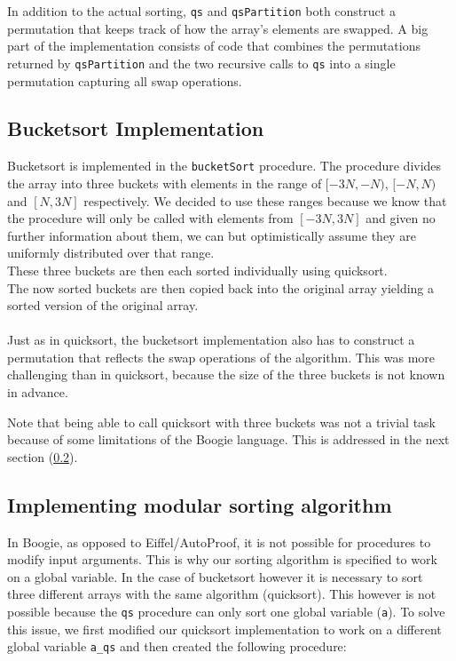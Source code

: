In addition to the actual sorting, \texttt{qs} and \texttt{qsPartition} both construct a permutation that
keeps track of how the array's elements are swapped. A big part of the implementation consists of code that
combines the permutations returned by \texttt{qsPartition} and the two recursive calls to \texttt{qs} into a single permutation
capturing all swap operations.

\subsection{Bucketsort Implementation}

Bucketsort is implemented in the \texttt{bucketSort} procedure.  
The procedure divides the array into three buckets with elements in the range of $[-3N, -N)$, $[-N,N)$ and
$[N,3N]$ respectively. 
We decided to use these ranges because we know that the procedure will only be called with elements from $[-3N,3N]$ and given no further information about them, we can but optimistically assume they are uniformly distributed over that range.\\
These three buckets are then each sorted individually using quicksort.\\
The now sorted buckets are then copied back into the original array yielding a sorted version
of the original array.
\\\\
Just as in quicksort, the bucketsort implementation also has to construct a permutation that reflects
the swap operations of the algorithm. This was more challenging than in quicksort, because the size of the
three buckets is not known in advance.

Note that being able to call quicksort with three buckets was not a trivial task because of some limitations
of the Boogie language. This is addressed in the next section (\ref{sec:mod_sort}).

\subsection{Implementing modular sorting algorithm}
\label{sec:mod_sort}

In Boogie, as opposed to Eiffel/AutoProof, it is not possible for procedures to modify input
arguments. This is why our sorting algorithm is specified to work on a global variable. 
In the case of bucketsort however it is necessary to sort three different arrays with the
same algorithm (quicksort). This however is not possible because the \texttt{qs} procedure
can only sort one global variable (\texttt{a}). To solve this issue, we first modified our quicksort implementation
to work on a different global variable \texttt{a\_qs} and then created the following procedure:

